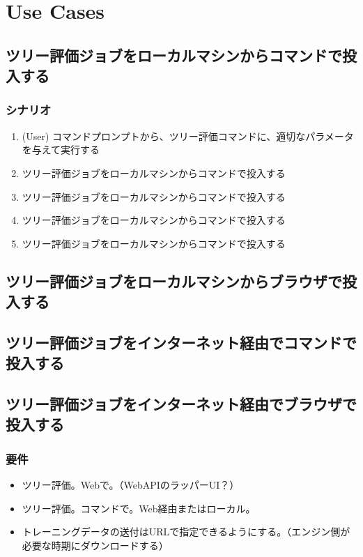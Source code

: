 \documentclass{jsbook}
\begin{document}
\section{Use Cases}

\subsection{ツリー評価ジョブをローカルマシンからコマンドで投入する}


\subsubsection{シナリオ}

\begin{enumerate}
	\item (User) コマンドプロンプトから、ツリー評価コマンドに、適切なパラメータを与えて実行する
	\item ツリー評価ジョブをローカルマシンからコマンドで投入する
	\item ツリー評価ジョブをローカルマシンからコマンドで投入する
	\item ツリー評価ジョブをローカルマシンからコマンドで投入する
	\item ツリー評価ジョブをローカルマシンからコマンドで投入する
\end{enumerate}


\subsection{ツリー評価ジョブをローカルマシンからブラウザで投入する}

\subsection{ツリー評価ジョブをインターネット経由でコマンドで投入する}

\subsection{ツリー評価ジョブをインターネット経由でブラウザで投入する}

\subsubsection{要件}
\begin{itemize}
	\item ツリー評価。Webで。（WebAPIのラッパーUI？）
	\item ツリー評価。コマンドで。Web経由またはローカル。
	\item トレーニングデータの送付はURLで指定できるようにする。（エンジン側が必要な時期にダウンロードする）
\end{itemize}
	
\end{document}
